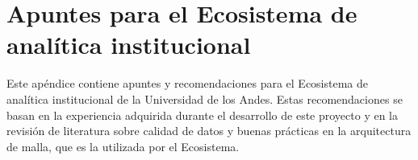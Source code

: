 \chapter{Apuntes para el Ecosistema de analítica institucional}
\label{ap:ecosistema}

Este apéndice contiene apuntes y recomendaciones para el Ecosistema de analítica institucional de la Universidad de los Andes. Estas recomendaciones se basan en la experiencia adquirida durante el desarrollo de este proyecto y en la revisión de literatura sobre calidad de datos y buenas prácticas en la arquitectura de malla, que es la utilizada por el Ecosistema.


